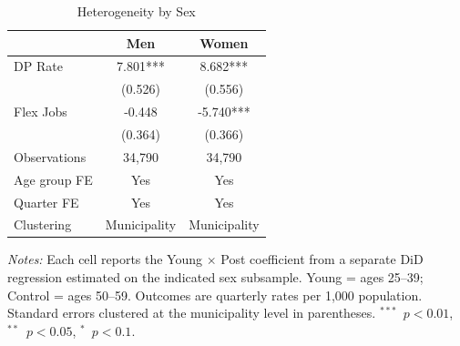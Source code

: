 \begin{table}[htbp]
\centering
\caption{Heterogeneity by Sex}
\label{tab:sex}
\small
\begin{tabular}{l*{2}{c}}
\toprule
 & Men & Women \\
\midrule
DP Rate & 7.801*** & 8.682*** \\
 & (0.526) & (0.556) \\
\addlinespace
Flex Jobs & -0.448 & -5.740*** \\
 & (0.364) & (0.366) \\
\midrule
Observations & 34,790 & 34,790 \\
Age group FE & Yes & Yes \\
Quarter FE & Yes & Yes \\
Clustering & Municipality & Municipality \\
\bottomrule
\end{tabular}
\begin{tablenotes}
\small
\item \textit{Notes:} Each cell reports the Young $\times$ Post coefficient from a separate DiD regression estimated on the indicated sex subsample. Young = ages 25--39; Control = ages 50--59. Outcomes are quarterly rates per 1,000 population. Standard errors clustered at the municipality level in parentheses. $^{***}$~$p<0.01$, $^{**}$~$p<0.05$, $^{*}$~$p<0.1$.
\end{tablenotes}
\end{table}
